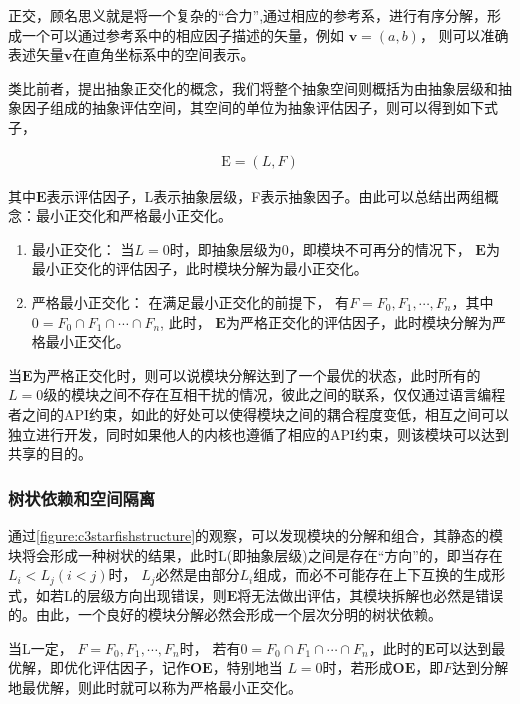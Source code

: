 正交，顾名思义就是将一个复杂的“合力”,通过相应的参考系，进行有序分解，形成一个可以通过参考系中的相应因子描述的矢量，例如 $\boldsymbol {v}=(a, b)$， 则可以准确表述矢量$\boldsymbol {v}$在直角坐标系中的空间表示。

类比前者，提出抽象正交化的概念，我们将整个抽象空间则概括为由抽象层级和抽象因子组成的抽象评估空间，其空间的单位为抽象评估因子，则可以得到如下式子，


\begin{equation}
    \label{equation:c3elf}
    \begin{aligned}
       \boldsymbol{\mathrm{E}} = (L, F)
    \end{aligned}
\end{equation}

其中$\boldsymbol{E}$表示评估因子，L表示抽象层级，F表示抽象因子。由此可以总结出两组概念：最小正交化和严格最小正交化。

\begin{enumerate}
    \item 最小正交化： 当$L=0$时，即抽象层级为0，即模块不可再分的情况下， $\boldsymbol{E}$为最小正交化的评估因子，此时模块分解为最小正交化。
    \item 严格最小正交化： 在满足最小正交化的前提下， 有$F = {F_{0}, F_{1}, \cdots, F_{n}}$，其中$0 = {F_{0} \cap F_{1} \cap \cdots \cap F_{n}}$, 此时， $\boldsymbol{E}$为严格正交化的评估因子，此时模块分解为严格最小正交化。
\end{enumerate}

当$\boldsymbol{E}$为严格正交化时，则可以说模块分解达到了一个最优的状态，此时所有的$L=0$级的模块之间不存在互相干扰的情况，彼此之间的联系，仅仅通过语言编程者之间的API约束，如此的好处可以使得模块之间的耦合程度变低，相互之间可以独立进行开发，同时如果他人的内核也遵循了相应的API约束，则该模块可以达到共享的目的。


\subsubsection{树状依赖和空间隔离}


通过\autoref{figure:c3starfishstructure}的观察，可以发现模块的分解和组合，其静态的模块将会形成一种树状的结果，此时L(即抽象层级)之间是存在“方向”的，即当存在$L_{i} < L_{j} (i < j)$时， $L_{j}$必然是由部分$L_{i}$组成，而必不可能存在上下互换的生成形式，如若L的层级方向出现错误，则$\boldsymbol{E}$将无法做出评估，其模块拆解也必然是错误的。由此，一个良好的模块分解必然会形成一个层次分明的树状依赖。

当L一定， $F = {F_{0}, F_{1}, \cdots, F_{n}}$时， 若有$0 = {F_{0} \cap F_{1} \cap \cdots \cap F_{n}}$，此时的$\boldsymbol{E}$可以达到最优解，即优化评估因子，记作$\boldsymbol{OE}$，特别地当 $L = 0$时，若形成$\boldsymbol{OE}$，即$F$达到分解地最优解，则此时就可以称为严格最小正交化。

